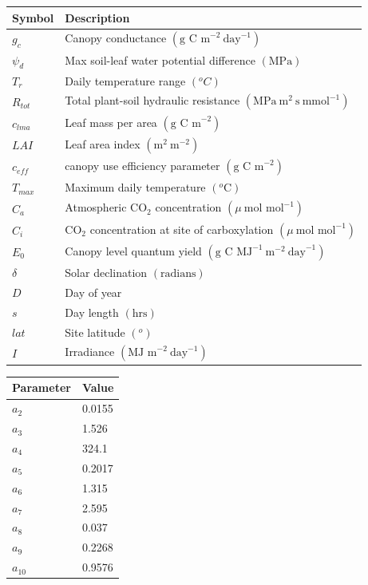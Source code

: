 \begin{center}
\begin{tabular}{| l | l |}
\hline
Symbol & Description \\ \hline
$g_c$ & Canopy conductance $(\text{g C m}^{-2}~\text{day}^{-1})$ \\ \hline
$\psi_d$ & Max soil-leaf water potential difference $(\text{MPa})$ \\ \hline
$T_r$ & Daily temperature range $( ^{o}C)$ \\ \hline
$R_{tot}$ & Total plant-soil hydraulic resistance $(\text{MPa}~\text{m}^2~\text{s}~\text{mmol}^{-1})$ \\ \hline
$c_{lma}$ & Leaf mass per area $(\text{g C m}^{-2})$  \\ \hline
$LAI$ & Leaf area index $(\text{m}^2~\text{m}^{-2})$ \\ \hline
$c_{eff}$ &canopy use efficiency parameter $(\text{g C m}^{-2})$  \\ \hline
$T_{max}$ & Maximum daily temperature $( ^{o}\text{C})$  \\ \hline
$C_a$ & Atmospheric CO$_2$ concentration $(\mu~\text{mol mol}^{-1})$ \\ \hline
$C_i$ & CO$_2$ concentration at site of carboxylation $(\mu~\text{mol mol}^{-1})$ \\ \hline
$E_0$ & Canopy level quantum yield $(\text{g C MJ}^{-1}~\text{m}^{-2}~\text{day}^{-1})$ \\ \hline
$\delta$ & Solar declination $(\text{radians})$ \\ \hline
$D$ & Day of year \\ \hline
$s$ & Day length $(\text{hrs})$ \\  \hline  
$lat$ & Site latitude $( ^{o})$ \\ \hline
$I$ & Irradiance $(\text{MJ m}^{-2}~\text{day}^{-1})$ \\ 
\hline
\end{tabular}    
 \label{chap5:table:acm}
\end{center}

\begin{center}
\begin{tabular}{| l | l |}
\hline
Parameter & Value \\ \hline
$a_2$ & 0.0155 \\ \hline
$a_3$ & 1.526 \\ \hline
$a_4$ & 324.1 \\ \hline
$a_5$ & 0.2017 \\ \hline
$a_6$ & 1.315 \\ \hline
$a_7$ & 2.595 \\ \hline
$a_8$ & 0.037 \\ \hline
$a_9$ & 0.2268 \\ \hline
$a_{10}$ & 0.9576 \\
\hline
\end{tabular}    
 \label{chap5:table:acm_params}
\end{center}

